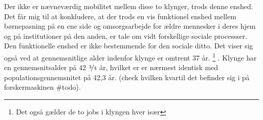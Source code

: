 Der ikke er nævneværdig mobilitet mellem disse to klynger, trods denne enshed. Det får mig til at konkludere, at der trods en vis funktionel enshed mellem børnepasning på en ene side og omsorgsarbejde for ældre mennesker i deres hjem og på institutioner på den anden, er tale om vidt forskellige sociale processser. Den funktionelle enshed er ikke bestemmende for den sociale ditto. Det viser sig også ved at gennemsnitlige alder indenfor klynge  er omtrent 37 år.%
%
\footnote{Det også gælder de to jobs i klyngen hver især}%
%
. Klynge  har en gennemsnitsalder på 42 $\nicefrac{3}{4}$ år, hvilket er er nærmest identisk med populationsgennemsnitet på 42,3 år. (check hvilken kvartil det befinder sig i på forskermaskinen \#todo). 



























%







